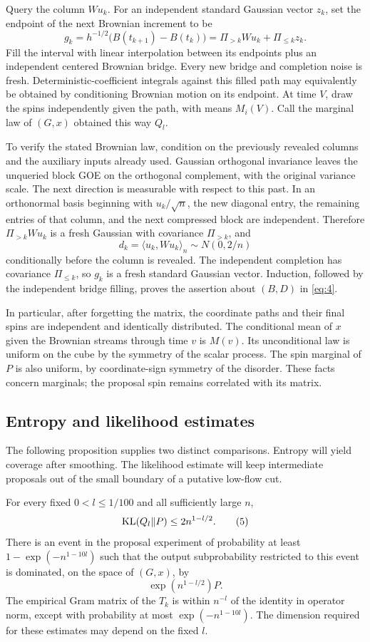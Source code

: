 Query the column $Wu_k$. For an independent standard Gaussian vector
$z_k$, set the endpoint of the next Brownian increment to be
\[
 g_k=h^{-1/2}\bigl(B(t_{k+1})-B(t_k)\bigr)
     =\Pi_{>k}Wu_k+\Pi_{\le k}z_k.
\]
Fill the interval with linear interpolation between its endpoints plus
an independent centered Brownian bridge. Every new bridge and completion
noise is fresh. Deterministic-coefficient integrals against this filled
path may equivalently be obtained by conditioning Brownian motion on
its endpoint. At time $V$, draw the spins independently given the path,
with means $M_i(V)$. Call the marginal law of $(G,x)$ obtained this way
$Q_l$.

To verify the stated Brownian law, condition on the previously revealed
columns and the auxiliary inputs already used. Gaussian orthogonal
invariance leaves the unqueried block GOE on the orthogonal complement,
with the original variance scale. The next direction is measurable with
respect to this past. In an orthonormal basis beginning with
$u_k/\sqrt n$, the new diagonal entry, the remaining entries of that
column, and the next compressed block are independent. Therefore
$\Pi_{>k}Wu_k$ is a fresh Gaussian with covariance $\Pi_{>k}$, and
\[
 d_k=\langle u_k,Wu_k\rangle_n\sim N(0,2/n)
\]
conditionally before the column is revealed. The independent completion
has covariance $\Pi_{\le k}$, so $g_k$ is a fresh standard Gaussian
vector. Induction, followed by the independent bridge filling, proves
the assertion about $(B,D)$ in \eqref{eq:4}.

In particular, after forgetting the matrix, the coordinate paths and
their final spins are independent and identically distributed. The
conditional mean of $x$ given the Brownian streams through time $v$ is
$M(v)$. Its unconditional law is uniform on the cube by the symmetry of
the scalar process. The spin marginal of $P$ is also uniform, by
coordinate-sign symmetry of the disorder. These facts concern marginals;
the proposal spin remains correlated with its matrix.

\subsection{Entropy and likelihood estimates}

The following proposition supplies two distinct comparisons. Entropy
will yield coverage after smoothing. The likelihood estimate will keep
intermediate proposals out of the small boundary of a putative low-flow
cut.

\begin{proposition}\label{prop:proposal}
For every fixed $0<l\le1/100$ and all sufficiently large $n$,
\[
 {\rm KL}(Q_l\Vert P)\le2n^{1-l/2}.
 \tag{5}\label{eq:5}
\]
There is an event in the proposal experiment of probability at least
$1-\exp(-n^{1-10l})$ such that the output subprobability restricted to
this event is dominated, on the space of $(G,x)$, by
\[
 \exp(n^{1-l/2})P.
 \tag{6}\label{eq:6}
\]
The empirical Gram matrix of the $T_k$ is within $n^{-l}$ of the
identity in operator norm, except with probability at most
$\exp(-n^{1-10l})$. The dimension required for these estimates may
depend on the fixed $l$.
\end{proposition}

